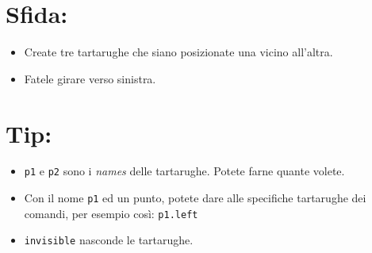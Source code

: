 \section*{\color{BrickRed}Sfida:}


\begin{itemize}

\item {Create tre tartarughe che siano posizionate una vicino all'altra.}
\item {Fatele girare verso sinistra.}

\end{itemize}


\section*{\color{OliveGreen}Tip:}


\begin{itemize}

\item {\lstinline{p1} e \lstinline{p2} sono i {\it names} delle tartarughe. Potete farne quante volete.}
\item {Con il nome \lstinline{p1} ed un punto, potete dare alle specifiche tartarughe dei comandi, per esempio così: \lstinline{p1.left}}
\item {\lstinline{invisible} nasconde le tartarughe.}

\end{itemize}


